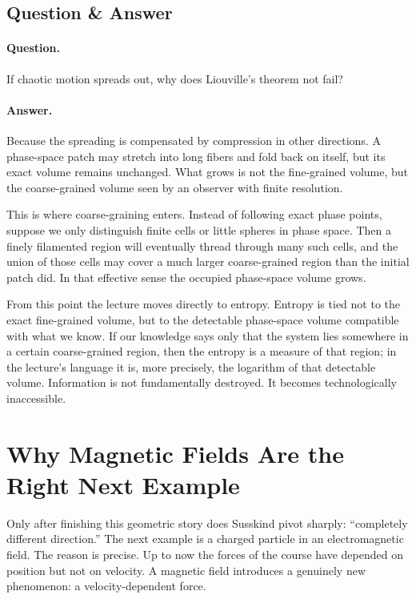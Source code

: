 \subsection{Question \& Answer}

\paragraph{Question.} If chaotic motion spreads out, why does Liouville's theorem not fail?

\paragraph{Answer.} Because the spreading is compensated by compression in other directions. A phase-space patch may stretch into long fibers and fold back on itself, but its exact volume remains unchanged. What grows is not the fine-grained volume, but the coarse-grained volume seen by an observer with finite resolution.

This is where coarse-graining enters. Instead of following exact phase points, suppose we only distinguish finite cells or little spheres in phase space. Then a finely filamented region will eventually thread through many such cells, and the union of those cells may cover a much larger coarse-grained region than the initial patch did. In that effective sense the occupied phase-space volume grows.

From this point the lecture moves directly to entropy. Entropy is tied not to the exact fine-grained volume, but to the detectable phase-space volume compatible with what we know. If our knowledge says only that the system lies somewhere in a certain coarse-grained region, then the entropy is a measure of that region; in the lecture's language it is, more precisely, the logarithm of that detectable volume. Information is not fundamentally destroyed. It becomes technologically inaccessible.

\section{Why Magnetic Fields Are the Right Next Example}

Only after finishing this geometric story does Susskind pivot sharply: ``completely different direction.'' The next example is a charged particle in an electromagnetic field. The reason is precise. Up to now the forces of the course have depended on position but not on velocity. A magnetic field introduces a genuinely new phenomenon: a velocity-dependent force.

